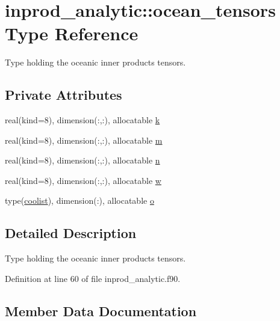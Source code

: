 \hypertarget{structinprod__analytic_1_1ocean__tensors}{}\section{inprod\+\_\+analytic\+:\+:ocean\+\_\+tensors Type Reference}
\label{structinprod__analytic_1_1ocean__tensors}


Type holding the oceanic inner products tensors.  


\subsection*{Private Attributes}
\begin{DoxyCompactItemize}
\item 
real(kind=8), dimension(\+:,\+:), allocatable \hyperlink{structinprod__analytic_1_1ocean__tensors_a1ab0d8f229b274e954a53cc1ce40cac1}{k}
\item 
real(kind=8), dimension(\+:,\+:), allocatable \hyperlink{structinprod__analytic_1_1ocean__tensors_a6f8f8b2b4ef239db0a9f751d7e8452e8}{m}
\item 
real(kind=8), dimension(\+:,\+:), allocatable \hyperlink{structinprod__analytic_1_1ocean__tensors_a5087e225a596aee2d668f6282dd6a019}{n}
\item 
real(kind=8), dimension(\+:,\+:), allocatable \hyperlink{structinprod__analytic_1_1ocean__tensors_ae4875d9d3ea854b3b7b57e0c07a07ede}{w}
\item 
type(\hyperlink{structtensor_1_1coolist}{coolist}), dimension(\+:), allocatable \hyperlink{structinprod__analytic_1_1ocean__tensors_a03c7dc35fc732e1011937eb4c4568c2e}{o}
\end{DoxyCompactItemize}


\subsection{Detailed Description}
Type holding the oceanic inner products tensors. 

Definition at line 60 of file inprod\+\_\+analytic.\+f90.



\subsection{Member Data Documentation}
